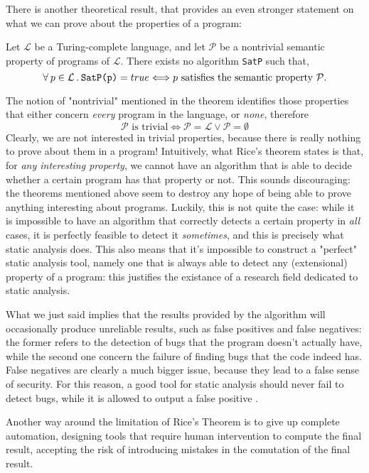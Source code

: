 \documentclass[12pt,a4paper]{book}
\newcommand{\st}{\hspace{2px}.\hspace{2px}}
\theoremstyle{definition}
\begin{document}
	There is another theoretical result, that provides an even stronger statement on what we can prove about the properties of a program:
	\begin{thm} Let $\mathcal{L}$ be a Turing-complete language, and let $\mathcal{P}$ be a nontrivial semantic property of programs of $\mathcal{L}$. There exists no algorithm \texttt{SatP} such that,
	\[
		\forall\hspace{2px}p\in\mathcal{L}\st\texttt{SatP(p)} = true \Longleftrightarrow p\text{ satisfies the semantic property } \mathcal{P}. 	
	\]
	\end{thm}
	The notion of "nontrivial" mentioned in the theorem identifies those properties that either concern \textit{every} program in the language, or \textit{none}, therefore
	\[
		\mathcal{P}\text{ is trivial} \Longleftrightarrow \mathcal{P} = \mathcal{L} \vee \mathcal{P} = \emptyset
	\]
	Clearly, we are not interested in trivial properties, because there is really nothing to prove about them in a program!
	Intuitively, what Rice's theorem states is that, for \textit{any interesting property}, we cannot have an algorithm that is able to decide whether a certain program has that property or not. This sounds discouraging: the theorems mentioned above seem to destroy any hope of being able to prove anything interesting about programs. Luckily, this is not quite the case: while it is impossible to have an algorithm that correctly detects a certain property in \textit{all} cases, it is perfectly feasible to detect it \textit{sometimes}, and this is precisely what static analysis does. This also means that it's impossible to construct a "perfect" static analysis tool, namely one that is always able to detect any (extensional) property of a program: this justifies the existance of a research field dedicated to static analysis.
	
	What we just said implies that the results provided by the algorithm will occasionally produce unreliable results, such as false positives and false negatives: the former refers to the detection of bugs that the program doesn't actually have, while the second one concern the failure of finding bugs that the code indeed has. False negatives are clearly a much bigger issue, because they lead to a false sense of security. For this reason, a good tool for static analysis should never fail to detect bugs, while it is allowed to output a false positive \cite{Gomes2009}.
	
	Another way around the limitation of Rice's Theorem is to give up complete automation, designing tools that require human intervention to compute the final result, accepting the risk of introducing mistakes in the comutation of the final result.
	
\end{document}
